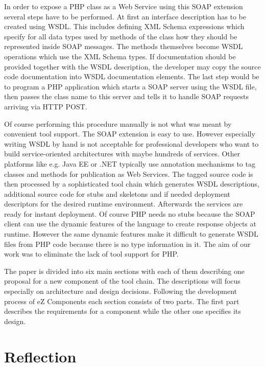 \documentclass[10pt,final,a4paper,oneside]{article}
\begin{document}
In order to expose a PHP class as a Web Service using this SOAP extension
several steps have to be performed.
At first an interface description has to be created using WSDL. This includes
defining XML Schema expressions \cite{XMLSchema} which specify for all data types
used by methods of the class how they should be represented inside SOAP messages.
The methods themselves become WSDL operations which use the XML Schema types.
If documentation should be provided together with the WSDL description,
the developer may copy the source code documentation into
WSDL documentation elements.
The last step would be to program a PHP application which starts a SOAP server
using the WSDL file, then passes the class name to this server and tells it to
handle SOAP requests arriving via HTTP POST.

Of course performing this procedure manually is not what was meant by
convenient tool support.
The SOAP extension is easy to use. However especially writing WSDL by hand is not
acceptable for professional developers who want to build service-oriented
architectures \cite{SOA} with maybe hundreds of services. Other platforms like e.g.
Java EE or .NET typically use annotation mechanisms to tag classes and methods
for publication as Web Services. The tagged source code is then processed by a
sophisticated tool chain which generates WSDL descriptions, additional source code
for stubs and skeletons and if needed deployment descriptors for the desired
runtime environment.
Afterwards the services are ready for instant deployment.
Of course PHP needs no stubs because the SOAP client can use the dynamic
features of the language to create response objects at runtime.
However the same dynamic features make it difficult to generate WSDL files from PHP
code because there is no type information in it.
The aim of our work was to eliminate the lack of tool support for PHP.

The paper is divided into six main sections
with each of them describing one proposal
for a new component of the tool chain.
The descriptions will focus especially on architecture and design decisions.
Following the development process of eZ Components each section consists of two parts.
The first part describes the requirements for a component while the other one
specifies its design.



\section{Reflection}\label{sec:Reflection}
%
\end{document}
